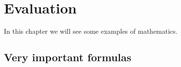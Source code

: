 \chapter{Evaluation}
In this chapter we will see some examples of mathematics.

\section{Very important formulas}
